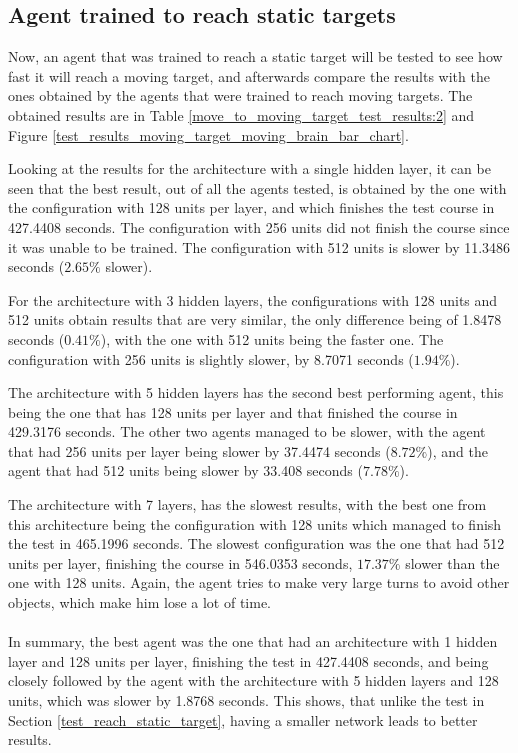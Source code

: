 \subsection{Agent trained to reach static targets}

Now, an agent that was trained to reach a static target will be tested to see how fast it will reach a moving target, and afterwards compare the results with the ones obtained by the agents that were trained to reach moving targets. The obtained results are in Table \ref{move_to_moving_target_test_results:2} and Figure \ref{test_results_moving_target_moving_brain_bar_chart}.

Looking at the results for the architecture with a single hidden layer, it can be seen that the best result, out of all the agents tested, is obtained by the one with the configuration with 128 units per layer, and which finishes the test course in 427.4408 seconds. The configuration with 256 units did not finish the course since it was unable to be trained. The configuration with 512 units is slower by 11.3486 seconds ($2.65\%$ slower).

For the architecture with 3 hidden layers, the configurations with 128 units and 512 units obtain results that are very similar, the only difference being of 1.8478 seconds ($0.41\%$), with the one with 512 units being the faster one. The configuration with 256 units is slightly slower, by 8.7071 seconds ($1.94\%$).

The architecture with 5 hidden layers has the second best performing agent, this being the one that has 128 units per layer and that finished the course in 429.3176 seconds. The other two agents managed to be slower, with the agent that had 256 units per layer being slower by 37.4474 seconds ($8.72\%$), and the agent that had 512 units being slower by 33.408 seconds ($7.78\%$).

The architecture with 7 layers, has the slowest results, with the best one from this architecture being the configuration with 128 units which managed to finish the test in 465.1996 seconds. The slowest configuration was the one that had 512 units per layer, finishing the course in 546.0353 seconds, $17.37\%$ slower than the one with 128 units. Again, the agent tries to make very large turns to avoid other objects, which make him lose a lot of time.

\paragraph{}
In summary, the best agent was the one that had an architecture with 1 hidden layer and 128 units per layer, finishing the test in 427.4408 seconds, and being closely followed by the agent with the architecture with 5 hidden layers and 128 units, which was slower by 1.8768 seconds. This shows, that unlike the test in Section \ref{test_reach_static_target}, having a smaller network leads to better results.

